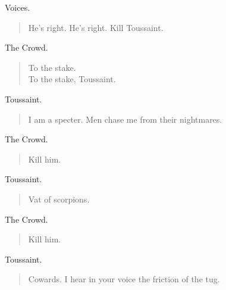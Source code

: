 \documentclass[letterpaper,article,12pt,oneside,notitlepage]{memoir}
\begin{document}
\begin{center}Voices.\end{center}

\begin{verse}
\hspace{1cm} He's right. He's right. Kill Toussaint. \\
\end{verse}

\begin{center}The Crowd.\end{center}

\begin{verse}
To the stake. \\
To the stake, Toussaint. \\
\end{verse}

\begin{center}Toussaint.\end{center}

\begin{verse}
\hspace{1cm} I am a specter. Men chase me from their nightmares. \\
\end{verse}

\begin{center}The Crowd.\end{center}

\begin{verse}
Kill him. \\
\end{verse}

\begin{center}Toussaint.\end{center}

\begin{verse}
Vat of scorpions. \\
\end{verse}

\begin{center}The Crowd.\end{center}

\begin{verse}
Kill him. \\
\end{verse}

\begin{center}Toussaint.\end{center}

\begin{verse}
Cowards. I hear in your voice the friction of the tug. \\
\end{verse}
\end{document}
